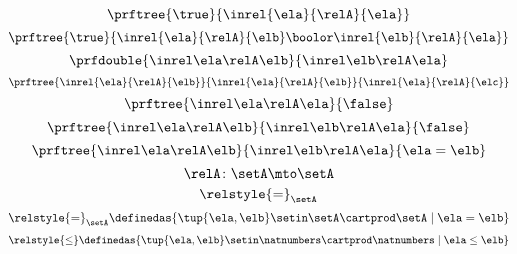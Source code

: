 \begin{forslides}
 \begin{equation}\label{eq:slides_session2_rel_139}
\prftree{\true}{\inrel{\ela}{\relA}{\ela}}
\end{equation}
\begin{equation}\label{eq:slides_session2_rel_140}
\prftree{\true}{\inrel{\ela}{\relA}{\elb} \boolor \inrel{\elb}{\relA}{\ela}}
\end{equation}
 \begin{equation}\label{eq:slides_session2_rel_141}
\prfdouble{
            \inrel \ela \relA \elb
        }{
            \inrel \elb \relA \ela
        }
\end{equation}
\begin{equation}\label{eq:slides_session2_rel_142}
\prftree{\inrel{\ela}{\relA}{\elb}}{\inrel{\ela}{\relA}{\elb}}{\inrel{\ela}{\relA}{\elc}}
\end{equation}
 \begin{equation}\label{eq:slides_session2_rel_143}
\prftree{
            \inrel \ela \relA \ela
        }{
            \false
        }
\end{equation}
\begin{equation}\label{eq:slides_session2_rel_144}
\prftree{
            \inrel \ela \relA \elb
        }{
            \inrel \elb \relA \ela
        }{
            \false
        } 
\end{equation}
 \begin{equation}\label{eq:slides_session2_rel_145}
\prftree{
            \inrel \ela \relA \elb
        }{
            \inrel \elb \relA \ela
        }{
            \ela = \elb
        }  
\end{equation}
\begin{equation}\label{eq:slides_session2_rel_146}
\relA\colon \setA \mto \setA
\end{equation}
 \begin{equation}\label{eq:slides_session2_rel_147}
\relstyle{=}_\setA
\end{equation}
\begin{equation}\label{eq:slides_session2_rel_148}
\relstyle{=}_\setA \definedas \{\tup{\ela,\elb}\setin \setA\cartprod \setA \mid \ela=\elb\}
\end{equation}
 \begin{equation}\label{eq:slides_session2_rel_149}
\relstyle{\leq} \definedas  \{\tup{\ela,\elb}\setin \natnumbers\cartprod \natnumbers\mid \ela \leq \elb\}
\end{equation}
\begin{equation}\label{eq:slides_session2_rel_150}

\end{equation}
\end{forslides}
